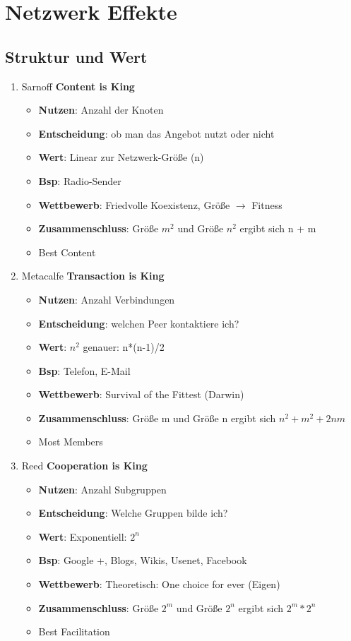 \documentclass{article} %
\begin{document}
	
	\section{Netzwerk Effekte}	
	\subsection{Struktur und Wert}
	\begin{enumerate}
		\item Sarnoff \textbf{Content is King}
		\begin{itemize}
			\item \textbf{Nutzen}: Anzahl der Knoten
			\item \textbf{Entscheidung}: ob man das Angebot nutzt oder nicht
			\item \textbf{Wert}: Linear zur Netzwerk-Größe (n)
			\item \textbf{Bsp}: Radio-Sender
			\item \textbf{Wettbewerb}: Friedvolle Koexistenz, Größe $\rightarrow$ Fitness
			\item \textbf{Zusammenschluss}: Größe $m^2$ und Größe $n^2$ ergibt sich n + m
			\item Best Content
		\end{itemize}
		\item Metacalfe \textbf{Transaction is King}
		\begin{itemize}
			\item \textbf{Nutzen}: Anzahl Verbindungen
			\item \textbf{Entscheidung}: welchen Peer kontaktiere ich?
			\item \textbf{Wert}: $n^2$ genauer: n*(n-1)/2
			\item \textbf{Bsp}: Telefon, E-Mail
			\item \textbf{Wettbewerb}: Survival of the Fittest (Darwin)
			\item \textbf{Zusammenschluss}: Größe m und Größe n ergibt sich $n^2 + m^2 + 2nm$
			\item Most Members
		\end{itemize}
		\item Reed \textbf{Cooperation is King}
		\begin{itemize}
			\item \textbf{Nutzen}: Anzahl Subgruppen
			\item \textbf{Entscheidung}: Welche Gruppen bilde ich?
			\item \textbf{Wert}: Exponentiell: $2^n$
			\item \textbf{Bsp}: Google +, Blogs, Wikis, Usenet, Facebook
			\item \textbf{Wettbewerb}: Theoretisch: One choice for ever (Eigen)
			\item \textbf{Zusammenschluss}: Größe $2^m$ und Größe $2^n$ ergibt sich $2^m * 2^n$
			\item Best Facilitation
		\end{itemize}
	\end{enumerate}
\end{document}
